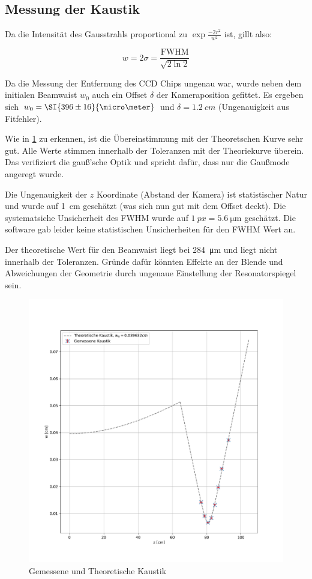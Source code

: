 \documentclass[slug=GL, room=HZDR\ Dresden/Rossendorf\,\ Geb.\ 620/123, supervisor=Tim\ Ziegler]{../../Lab_Report_LaTeX/lab_report}
\begin{document}
\subsection{Messung der Kaustik}
\label{sec:messkaustdisk}
Da die Intensit\"at des Gausstrahls proportional zu
\(\exp{\frac{-2r^2}{w^2}}\) ist, gillt also:

\begin{equation}
  \label{eq:beamwaistfwhm}
  w = 2\sigma = \frac{\text{FWHM}}{\sqrt{2\ln{2}}}
\end{equation}

Da die Messung der Entfernung des CCD Chips ungenau war, wurde neben
dem initialen Beamwaist \(w_0\) auch ein Offset \(\delta\) der Kameraposition
gefittet. Es ergeben sich \(w_0=\SI{396\pm 16}{\micro\meter}\) und
\(\delta=\SI{1.2}{cm}\) (Ungenauigkeit aus Fitfehler).

Wie in \ref{fig:kaustik} zu erkennen, ist die \"Ubereinstimmung mit
der Theoretschen Kurve sehr gut. Alle Werte stimmen innerhalb der
Toleranzen mit der Theoriekurve \"uberein. Das verifiziert die
gauß'sche Optik und spricht daf\"ur, dass nur die Gau\ss{}mode angeregt
wurde.

Die Ungenauigkeit der \(z\) Koordinate (Abstand der Kamera) ist
statistischer Natur und wurde auf \SI{1}{\centi\meter} gesch\"atzt
(was sich nun gut mit dem Offset deckt). Die systematsiche
Unsicherheit des FWHM wurde auf \(\SI{1}{px}=\SI{5.6}{\micro\meter}\)
gesch\"atzt. Die software gab leider keine statistischen
Unsicherheiten f\"ur den FWHM Wert an.

Der theoretische Wert f\"ur den Beamwaist liegt bei
\SI{284}{\micro\meter} und liegt nicht innerhalb der Toleranzen. Gr\"unde
daf\"ur k\"onnten Effekte an der Blende und Abweichungen der Geometrie
durch ungenaue Einstellung der Resonatorspiegel sein.

\begin{figure}[b]\centering
  \includegraphics[width=.8\columnwidth]{figs/kaustik.pdf}
  \caption{Gemessene und Theoretische Kaustik}
  \label{fig:kaustik}
\end{figure}
\end{document}
